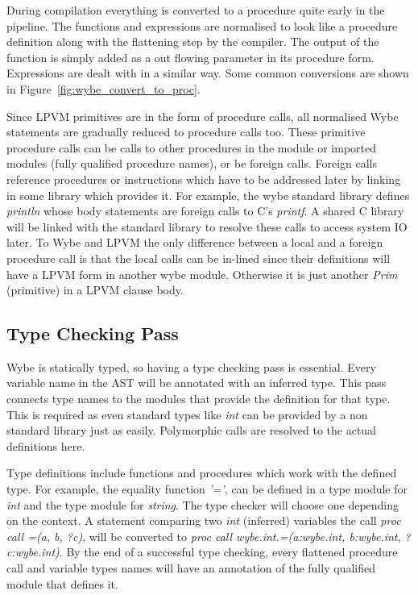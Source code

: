 During compilation everything is converted to a procedure quite early
in the pipeline. The functions and expressions are normalised to look like a
procedure definition along with the flattening step by the compiler. The output
of the function is simply added as a out flowing parameter in its procedure
form. Expressions are dealt with in a similar way.  Some common conversions are
shown in Figure~\ref{fig:wybe_convert_to_proc}.

Since LPVM primitives are in the form of procedure calls, all normalised Wybe
statements are gradually reduced to procedure calls too. These primitive
procedure calls can be calls to other procedures in the module or imported
modules (fully qualified procedure names), or be foreign calls. Foreign calls
reference procedures or instructions which have to be addressed later by
linking in some library which provides it. For example, the wybe standard
library defines \textit{println} whose body statements are foreign calls to C's
\textit{printf}. A shared C library will be linked with the standard library to
resolve these calls to access system IO later. To Wybe and LPVM the only
difference between a local and a foreign procedure call is that the local calls
can be in-lined since their definitions will have a LPVM form in another wybe
module. Otherwise it is just another \textit{Prim} (primitive) in a LPVM clause
body.

\subsection{Type Checking Pass}

Wybe is statically typed, so having a type checking pass is essential. Every
variable name in the AST will be annotated with an inferred type. This pass
connects type names to the modules that provide the definition for that
type. This is required as even standard types like \textit{int} can be provided
by a non standard library just as easily. Polymorphic calls are resolved to the
actual definitions here.

Type definitions include functions and procedures which work with the defined
type. For example, the equality function \textit{'='}, can be defined in a type
module for \textit{int} and the type module for \textit{string}. The type
checker will choose one depending on the context. A statement comparing two
\textit{int} (inferred) variables the call \textit{proc call =(a, b, ?c)}, will
be converted to \textit{proc call wybe.int.=(a:wybe.int, b:wybe.int,
  ?c:wybe.int)}. By the end of a successful type checking, every flattened
procedure call and variable types names will have an annotation of the fully
qualified module that defines it.


